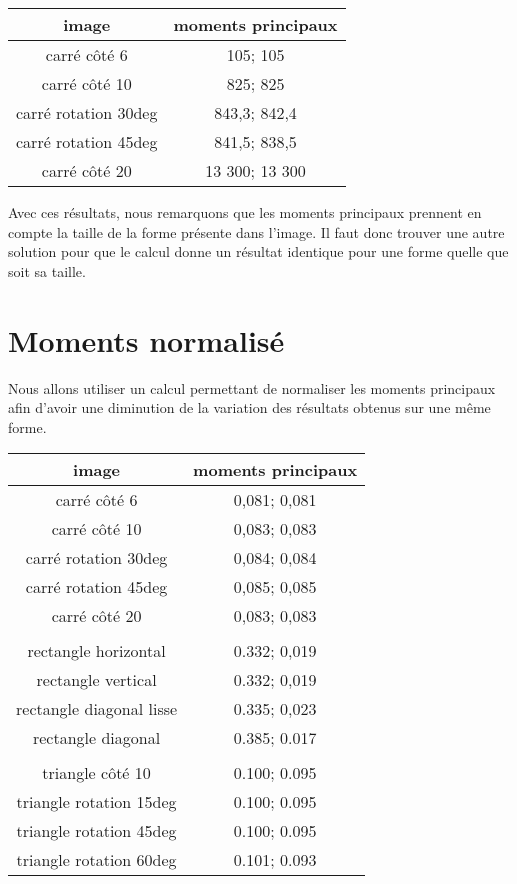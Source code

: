 \documentclass{article}
\begin{document}
  \begin{center}
    \begin{tabular}{|c|c|}
      \hline
      \textbf{image} & \textbf{moments principaux} \\
      \hline
      carré côté 6 & 105; 105 \\
      \hline
      carré côté 10 & 825; 825 \\
      \hline
      carré rotation 30deg & 843,3; 842,4 \\
      \hline
      carré rotation 45deg & 841,5; 838,5 \\
      \hline
      carré côté 20 & 13 300; 13 300 \\
      \hline
    \end{tabular}
  \end{center}
  
  Avec ces résultats, nous remarquons que les moments principaux prennent en compte
  la taille de la forme présente dans l'image.
  Il faut donc trouver une autre solution pour que le calcul donne un résultat identique
  pour une forme quelle que soit sa taille.
  
  \section{Moments normalisé}
  Nous allons utiliser un calcul permettant de normaliser les moments principaux afin d'avoir
  une diminution de la variation des résultats obtenus sur une même forme.\\
  
   \begin{center}
    \begin{tabular}{|c|c|}
      \hline
      \textbf{image} & \textbf{moments principaux} \\
      \hline
      carré côté 6 & 0,081; 0,081 \\
      \hline
      carré côté 10 & 0,083; 0,083 \\
      \hline
      carré rotation 30deg & 0,084; 0,084 \\
      \hline
      carré rotation 45deg & 0,085; 0,085 \\
      \hline
      carré côté 20 & 0,083; 0,083 \\
      \hline
       & \\
      \hline
      rectangle horizontal & 0.332; 0,019 \\
      \hline
      rectangle vertical & 0.332; 0,019 \\
      \hline
      rectangle diagonal lisse & 0.335; 0,023 \\
      \hline
      rectangle diagonal & 0.385; 0.017 \\
      \hline
       & \\
      \hline
      triangle côté 10 & 0.100; 0.095\\
      \hline
      triangle rotation 15deg & 0.100; 0.095\\
      \hline
      triangle rotation 45deg & 0.100; 0.095\\
      \hline
      triangle rotation 60deg & 0.101; 0.093\\
      \hline
    \end{tabular}
  \end{center}
  
\end{document}
